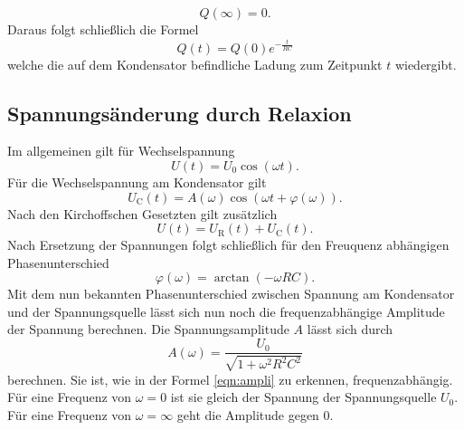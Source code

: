 \begin{equation*}
    Q(\infty) = 0.
\end{equation*}
Daraus folgt schließlich die Formel
\begin{equation}
    Q(t) = Q(0) e^{-\frac{t}{RC}}
    \label{eqn:ladungkondi}
\end{equation}
welche die auf dem Kondensator befindliche Ladung zum Zeitpunkt $t$ wiedergibt.

\subsection{Spannungsänderung durch Relaxion}
Im allgemeinen gilt für Wechselspannung 
\begin{equation}
    U(t) = U_0 \cos(\omega t).
\end{equation}
Für die Wechselspannung am Kondensator gilt 
\begin{equation}
    U_\text{C}(t) = A(\omega) \cos(\omega t + \varphi(\omega)).
\end{equation}
Nach den Kirchoffschen Gesetzten gilt zusätzlich
\begin{equation}
    U(t) = U_\text{R}(t) + U_\text{C}(t).
\end{equation}
Nach Ersetzung der Spannungen folgt schließlich für den Freuquenz abhängigen Phasenunterschied
\begin{equation}
    \varphi(\omega) = \arctan(-\omega RC).
    \label{eqn:phase}
\end{equation}
Mit dem nun bekannten Phasenunterschied zwischen Spannung am Kondensator und der Spannungsquelle lässt sich nun noch die frequenzabhängige Amplitude der Spannung berechnen.
Die Spannungsamplitude $A$ lässt sich durch 
\begin{equation}
    A(\omega) = \frac{U_0}{\sqrt{1+\omega^2 R^2 C^2}}
    \label{eqn:ampli}
\end{equation}
berechnen.
Sie ist, wie in der Formel \ref{eqn:ampli} zu erkennen, frequenzabhängig.
Für eine Frequenz von $\omega = 0$ ist sie gleich der Spannung der Spannungsquelle $U_0$.
Für eine Frequenz von $\omega = \infty$ geht die Amplitude gegen 0.

